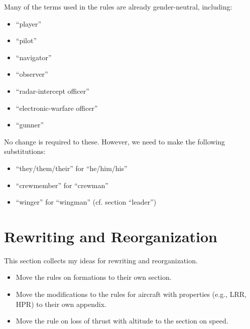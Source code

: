 \documentclass[10pt]{article}
\begin{document}
Many of the terms used in the rules are already gender-neutral, including:
\begin{itemize}
    \item “player”
    \item “pilot”
    \item “navigator”
    \item “observer”
    \item “radar-intercept officer”
    \item “electronic-warfare officer”
    \item “gunner”
\end{itemize}
No change is required to these. However, we need to make the following substitutions: 
\begin{itemize}
    \item “they/them/their” for “he/him/his”
    \item “crewmember” for “crewman”
    \item “winger” for “wingman” (cf. section “leader”)
\end{itemize}

\section*{Rewriting and Reorganization}

This section collects my ideas for rewriting and reorganization.

\begin{itemize}
    \item Move the rules on formations to their own section.
    \item Move the modifications to the rules for aircraft with properties (e.g., LRR, HPR) to their own appendix.
    \item Move the rule on loss of thrust with altitude to the section on speed.
\end{itemize}
\end{document}

